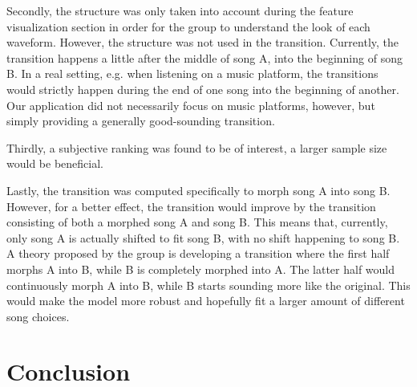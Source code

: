 \documentclass{article}
\begin{document}
Secondly, the structure was only taken into account during the feature visualization section in order for the group to understand the look of each waveform. However, the structure was not used in the transition. Currently, the transition happens a little after the middle of song A, into the beginning of song B. In a real setting, e.g. when listening on a music platform, the transitions would strictly happen during the end of one song into the beginning of another. Our application did not necessarily focus on music platforms, however, but simply providing a generally good-sounding transition.

Thirdly, a subjective ranking was found to be of interest, a larger sample size would be beneficial.

Lastly, the transition was computed specifically to morph song A into song B. However, for a better effect, the transition would improve by the transition consisting of both a morphed song A and song B. This means that, currently, only song A is actually shifted to fit song B, with no shift happening to song B. A theory proposed by the group is developing a transition where the first half morphs A into B, while B is completely morphed into A. The latter half would continuously morph A into B, while B starts sounding more like the original. This would make the model more robust and hopefully fit a larger amount of different song choices.







\section{Conclusion}



\end{document}
